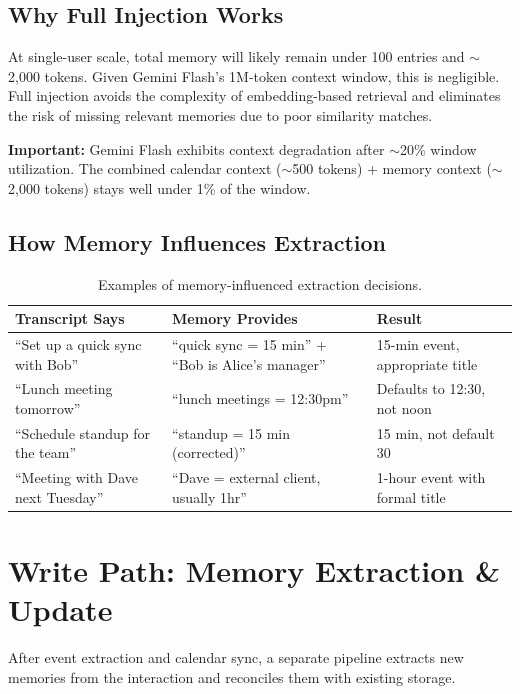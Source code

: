 \documentclass[11pt, letterpaper]{article}
\begin{document}
\subsection{Why Full Injection Works}

At single-user scale, total memory will likely remain under 100 entries and
$\sim$2,000 tokens. Given Gemini Flash's 1M-token context window, this is negligible.
Full injection avoids the complexity of embedding-based retrieval and eliminates
the risk of missing relevant memories due to poor similarity matches.

\textbf{Important:} Gemini Flash exhibits context degradation after $\sim$20\%
window utilization. The combined calendar context ($\sim$500 tokens) + memory
context ($\sim$2,000 tokens) stays well under 1\% of the window.

\subsection{How Memory Influences Extraction}

\begin{table}[h]
\centering
\small
\begin{tabularx}{\textwidth}{XXX}
\toprule
\textbf{Transcript Says} & \textbf{Memory Provides} & \textbf{Result} \\
\midrule
``Set up a quick sync with Bob'' & ``quick sync = 15 min'' + ``Bob is Alice's manager'' & 15-min event, appropriate title \\
\addlinespace
``Lunch meeting tomorrow'' & ``lunch meetings = 12:30pm'' & Defaults to 12:30, not noon \\
\addlinespace
``Schedule standup for the team'' & ``standup = 15 min (corrected)'' & 15 min, not default 30 \\
\addlinespace
``Meeting with Dave next Tuesday'' & ``Dave = external client, usually 1hr'' & 1-hour event with formal title \\
\bottomrule
\end{tabularx}
\caption{Examples of memory-influenced extraction decisions.}
\end{table}

\section{Write Path: Memory Extraction \& Update}

After event extraction and calendar sync, a separate pipeline extracts new memories
from the interaction and reconciles them with existing storage.
\end{document}
